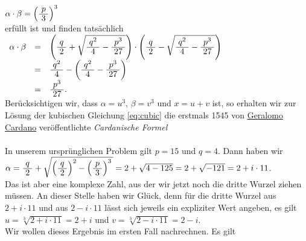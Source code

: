 $\alpha \cdot \beta = \Bigl(\bruch{p}{3}\Bigr)^3$
\\[0.2cm]
erf\"{u}llt ist und finden tats\"{a}chlich
\\[0.2cm]
\hspace*{1.3cm}
$
\begin{array}[t]{lcl}
      \alpha \cdot \beta 
& = & \left(\bruch{q}{2} + \sqrt{\bruch{q^2}{4} - \bruch{p^3}{27}}\right) \cdot
      \left(\bruch{q}{2} - \sqrt{\bruch{q^2}{4} - \bruch{p^3}{27}}\right)        \\[0.2cm]
& = & \bruch{q^2}{4} - \left(\bruch{q^2}{4} - \bruch{p^3}{27}\right)             \\[0.2cm]
& = & \bruch{p^3}{27}.                                            
\end{array}
$
\\[0.2cm]
Ber\"{u}cksichtigen wir, dass $\alpha = u^3$, $\beta = v^3$ und $x = u + v$ ist,
so erhalten wir zur L\"{o}sung der kubischen Gleichung \ref{eq:cubic} die 
erstmals 1545 von \href{http://de.wikipedia.org/wiki/Gerolamo_Cardano}{Geralomo Cardano} ver\"{o}ffentlichte 
\emph{Cardanische Formel}
\\[0.2cm]
\hspace*{1.3cm}
\\[0.2cm]
In unserem urspr\"{u}nglichen Problem gilt $p = 15$ und $q = 4$.  Dann haben wir 
\\[0.2cm]
\hspace*{1.3cm}
$\alpha = \bruch{q}{2} + \sqrt{\left(\bruch{q}{2}\right)^2 - \left(\bruch{p}{3}\right)^3\,} =
 2 + \sqrt{4 - 125} = 2 + \sqrt{-121} = 2 + i \cdot 11
$.
\\[0.2cm]
Das ist aber eine komplexe Zahl, aus der wir jetzt noch die dritte Wurzel ziehen m\"{u}ssen.
An dieser Stelle haben wir Gl\"{u}ck, denn f\"{u}r die dritte Wurzel aus $2 + i \cdot 11$ und aus 
$2 - i \cdot 11$ l\"{a}sst sich jeweils ein expliziter Wert angeben, es gilt
\\[0.2cm]
\hspace*{1.3cm}
$u = \sqrt[3]{2 + i \cdot 11} = 2 + i$  \quad und \quad 
$v = \sqrt[3]{2 - i \cdot 11} = 2 - i$.
\\[0.2cm]
Wir wollen dieses Ergebnis im ersten Fall nachrechnen.  Es gilt
\\[0.2cm]
\hspace*{1.3cm}

